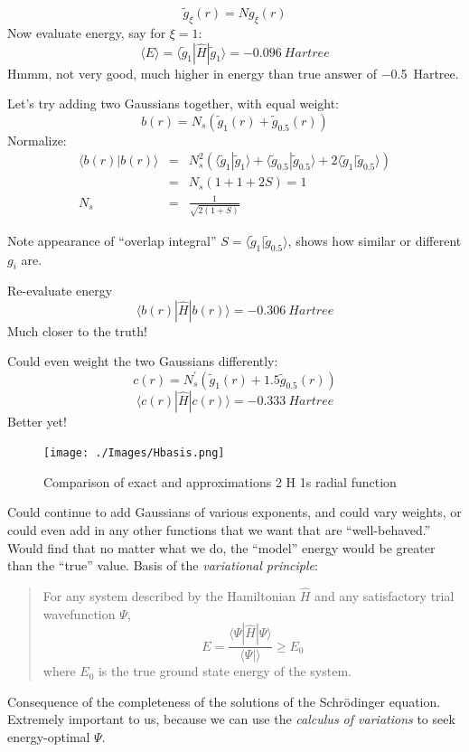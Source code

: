 \documentclass[11pt]{article}
\begin{document}
\[\tilde{g}_\xi(r) = N g_\xi(r)\]
Now evaluate energy, say for \(\xi=1\):
\[\langle E \rangle = \langle \tilde{g}_1|\hat{H}|\tilde{g}_1\rangle = \SI{-0.096}{Hartree} \]
Hmmm, not very good, much higher in energy than true answer of \SI{-0.5}{Hartree}. 

Let's try adding two Gaussians together, with equal weight:
\[b(r) = N_s \left(\tilde{g}_1(r) + \tilde{g}_{0.5}(r) \right )\]
Normalize:
\begin{eqnarray}
\langle b(r)|b(r)\rangle & = & N_s^2 \left(\langle\tilde{g}_1 | \tilde{g}_1\rangle + \langle\tilde{g}_{0.5} | \tilde{g}_{0.5}\rangle + 2\langle\tilde{g}_1 | \tilde{g}_{0.5}\rangle\right)\\
 &=& N_s(1+1 + 2 S) =1 \\
N_s &= &\frac{1}{\sqrt{2(1+S)}}
\end{eqnarray}

Note appearance of ``overlap integral'' \(S=\langle \tilde{g}_1|\tilde{g}_{0.5}\rangle\), shows how similar or different \(g_i\) are.

Re-evaluate energy
\[\langle b(r) |\hat{H} |b(r) \rangle = \SI{-0.306}{Hartree} \]
Much closer to the truth!  

Could even weight the two Gaussians differently:
\[c(r) = N_s^\prime \left(\tilde{g}_1(r) + 1.5 \tilde{g}_{0.5}(r) \right )\]
\[\langle c(r) |\hat{H} |c(r) \rangle = \SI{-0.333}{Hartree} \]
Better yet!

\begin{figure}[htbp]
\centering
\texttt{[image: ./Images/Hbasis.png]}
\caption{Comparison of exact and approximations 2 H 1s radial function}
\end{figure}

Could continue to add Gaussians of various exponents, and could vary weights, or could
even add in any other functions that we want that are ``well-behaved.'' Would find that no
matter what we do, the ``model'' energy would be greater than the ``true'' value.  Basis of the \emph{variational principle}:

\begin{quote}
For any system described by the Hamiltonian \(\hat{H}\) and any satisfactory trial wavefunction \(\Psi\),
\[ E = \frac{\langle \Psi | \hat{H} | \Psi \rangle}{\langle \Psi | \rangle } \ge E_0\]
where \(E_0\) is the true ground state energy of the system.
\end{quote}

Consequence of the completeness of the solutions of the Schr\"{o}dinger equation.  Extremely important to us, because we can use the \emph{calculus of variations} to seek energy-optimal \(\Psi\).
\end{document}
